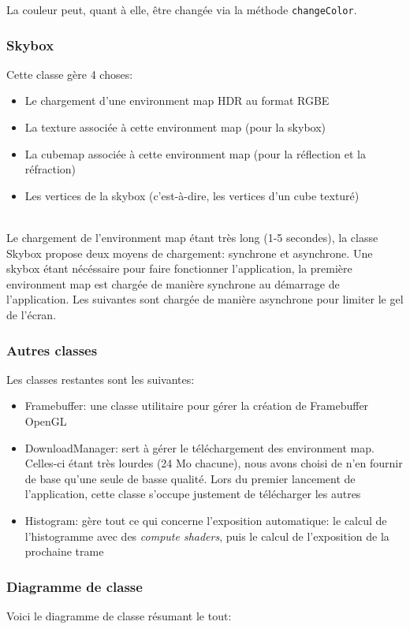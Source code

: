 \documentclass[a4paper,12pt]{article}
\newcommand{\svg}[2][0cm]{
    \begin{figure}[H]
        \centering
        \def\svgwidth{\columnwidth - #1}
        
    \end{figure}
}
\begin{document}
La couleur peut, quant à elle, être changée via la méthode \texttt{changeColor}.

\subsubsection{Skybox}
Cette classe gère 4 choses:
\begin{itemize}
    \item Le chargement d'une environment map HDR au format RGBE
    \item La texture associée à cette environment map (pour la skybox)
    \item La cubemap associée à cette environment map (pour la réflection et la réfraction)
    \item Les vertices de la skybox (c'est-à-dire, les vertices d'un cube texturé)
\end{itemize}

\ \\
Le chargement de l'environment map étant très long (1-5 secondes), la classe Skybox propose deux moyens de chargement:
synchrone et asynchrone. Une skybox étant nécéssaire pour faire fonctionner l'application, la première environment map
est chargée de manière synchrone au démarrage de l'application. Les suivantes sont chargée de manière asynchrone
pour limiter le gel de l'écran.

\subsubsection{Autres classes}
Les classes restantes sont les suivantes:
\begin{itemize}
    \item Framebuffer: une classe utilitaire pour gérer la création de Framebuffer OpenGL
    \item DownloadManager: sert à gérer le téléchargement des environment map. Celles-ci étant très lourdes (24 Mo chacune), nous avons choisi de n'en fournir de base qu'une seule de basse qualité. Lors du premier lancement de l'application, cette classe s'occupe justement de télécharger les autres
    \item Histogram: gère tout ce qui concerne l'exposition automatique: le calcul de l'histogramme avec des \emph{compute shaders}, puis le calcul de l'exposition de la prochaine trame
\end{itemize}

\subsubsection{Diagramme de classe}
Voici le diagramme de classe résumant le tout:
\svg{UML}
\end{document}
